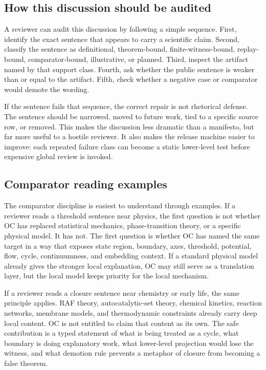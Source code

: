 \subsection{How this discussion should be audited}

A reviewer can audit this discussion by following a simple sequence. First,
identify the exact sentence that appears to carry a scientific claim. Second,
classify the sentence as definitional, theorem-bound, finite-witness-bound,
replay-bound, comparator-bound, illustrative, or planned. Third, inspect the
artifact named by that support class. Fourth, ask whether the public sentence
is weaker than or equal to the artifact. Fifth, check whether a negative case
or comparator would demote the wording.

If the sentence fails that sequence, the correct repair is not rhetorical
defense. The sentence should be narrowed, moved to future work, tied to a
specific source row, or removed. This makes the discussion less dramatic than a
manifesto, but far more useful to a hostile reviewer. It also makes the release
machine easier to improve: each repeated failure class can become a static
lower-level test before expensive global review is invoked.

\subsection{Comparator reading examples}

The comparator discipline is easiest to understand through examples. If a
reviewer reads a threshold sentence near physics, the first question is not
whether OC has replaced statistical mechanics, phase-transition theory, or a
specific physical model. It has not. The first question is whether OC has
named the same target in a way that exposes state region, boundary, axes,
threshold, potential, flow, cycle, continuumness, and embedding context. If a
standard physical model already gives the stronger local explanation, OC may
still serve as a translation layer, but the local model keeps priority for the
local mechanism.

If a reviewer reads a closure sentence near chemistry or early life, the same
principle applies. RAF theory, autocatalytic-set theory, chemical kinetics,
reaction networks, membrane models, and thermodynamic constraints already
carry deep local content. OC is not entitled to claim that content as its own.
The safe contribution is a typed statement of what is being treated as a
cycle, what boundary is doing explanatory work, what lower-level projection
would lose the witness, and what demotion rule prevents a metaphor of closure
from becoming a false theorem.

